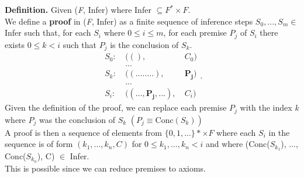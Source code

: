 \documentclass[11pt]{article}
\begin{document}
\begin{tcolorbox}[
    enhanced,
    frame hidden,
    borderline west={2pt}{0pt}{black},
    boxsep=5pt,
    left=8pt
]
\textbf{Definition.} Given (\textit{F}, Infer) where Infer $\subseteq F^{*} \times F$. \\ 

We define a \textbf{proof} in (\textit{F}, Infer) as a finite sequence of inference steps $S_0, ..., S_m \in$ Infer such that, for each $S_i$ where $0 \leq i \leq m$, for each premise $P_j$ of $S_i$ there exists $0 \leq k < i$ such that $P_j$ is the conclusion of $S_k$.
\[
	\begin{align*}
		S_0 : &\ ((), &\ C_0) \\
		      &\ ... &\ \\
		S_k : &\ ((........), &\ \mathbf{P_j}) \\ 
		      &\ ... &\ \\
		S_i : &\ ((..., \mathbf{P_j}, ...), &\ C_i)
	\end{align*}
.\] 
Given the definition of the proof, we can replace each premise $P_j$ with the index \textit{k} where $P_j$ was the conclusion of $S_k$ $(P_j \equiv \text{Conc}(S_k))$ \\

A proof is then a sequence of elements from $\{0, 1, ...\}* \times F$ where each $S_i$ in the sequence is of form $(k_1, ..., k_n, C)$ for $0 \leq k_1, ..., k_n < i$ and where (Conc($S_{k_1}$), ..., Conc($S_{k_n}$), C) $\in$ Infer. \\

This is possible since we can reduce premises to axioms. 
\end{tcolorbox}
\end{document}
